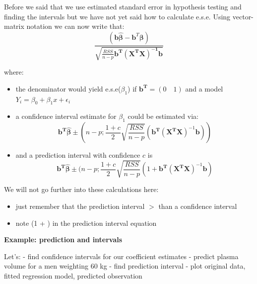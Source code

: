 \documentclass[
]{book}
\providecommand{\tightlist}{%
  \setlength{\itemsep}{0pt}\setlength{\parskip}{0pt}}
\theoremstyle{definition}
\theoremstyle{definition}
\theoremstyle{definition}
\theoremstyle{remark}
\begin{document}
Before we said that we use estimated standard error in hypothesis testing and finding the intervals but we have not yet said how to calculate e.s.e. Using vector-matrix notation we can now write that:
\[\frac{(\mathbf{b}\hat{{\boldsymbol\beta}}-\mathbf{b}^T\boldsymbol\beta)}{\sqrt{\frac{RSS}{n-p}\mathbf{b^T(X^TX)^{-1}b}}}\]

where:

\begin{itemize}
\item
  the denominator would yield e.s.e(\(\beta_1\)) if \(\mathbf{b^T}=(0 \quad 1)\) and a model \(Y_i = \beta_0 + \beta_1x + \epsilon_i\)
\item
  a confidence interval estimate for \(\beta_1\) could be estimated via:
  \[\mathbf{b^T}\hat{\boldsymbol\beta} \pm (n-p; \frac{1+c}{2}\sqrt{\frac{RSS}{n-p}}(\mathbf{b^T}(\mathbf{X^T}\mathbf{X})^{-1}\mathbf{b}))\]
\item
  and a prediction interval with confidence \(c\) is
  \[\mathbf{b^T}\hat{\boldsymbol\beta} \pm (n-p; \frac{1+c}{2}\sqrt{\frac{RSS}{n-p}}(1+\mathbf{b^T}(\mathbf{X^T}\mathbf{X})^{-1}\mathbf{b})\]
\end{itemize}

We will not go further into these calculations here:

\begin{itemize}
\tightlist
\item
  just remember that the prediction interval \(>\) than a confidence interval
\item
  note (1 + ) in the prediction interval equation
\end{itemize}

\textbf{Example: prediction and intervals}

Let's:
- find confidence intervals for our coefficient estimates
- predict plasma volume for a men weighting 60 kg
- find prediction interval
- plot original data, fitted regression model, predicted observation
\end{document}
